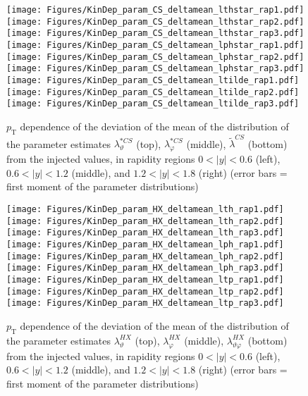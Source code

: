\documentclass[12pt]{article}
\newcommand{\pT}{p_\mathrm{T}}
\newcommand{\absy}{\left |  y \right |}
\newcommand{\lamtildeCS}{\tilde{\lambda}^{\scriptscriptstyle CS}}
\newcommand{\lamthstarCS}{\lambda^{* \scriptscriptstyle CS}_\vartheta}
\newcommand{\lamphstarCS}{\lambda^{* \scriptscriptstyle CS}_\varphi}
\newcommand{\lamthHX}{\lambda^{\scriptscriptstyle HX}_\vartheta}
\newcommand{\lamphHX}{\lambda^{\scriptscriptstyle HX}_\varphi}
\newcommand{\lamthphHX}{\lambda^{\scriptscriptstyle HX}_{\vartheta \varphi}}
\begin{document}
\begin{figure}[htbp]
\centering
\texttt{[image: Figures/KinDep\_param\_CS\_deltamean\_lthstar\_rap1.pdf]}
\texttt{[image: Figures/KinDep\_param\_CS\_deltamean\_lthstar\_rap2.pdf]}
\texttt{[image: Figures/KinDep\_param\_CS\_deltamean\_lthstar\_rap3.pdf]}
\texttt{[image: Figures/KinDep\_param\_CS\_deltamean\_lphstar\_rap1.pdf]}
\texttt{[image: Figures/KinDep\_param\_CS\_deltamean\_lphstar\_rap2.pdf]}
\texttt{[image: Figures/KinDep\_param\_CS\_deltamean\_lphstar\_rap3.pdf]}
\texttt{[image: Figures/KinDep\_param\_CS\_deltamean\_ltilde\_rap1.pdf]}
\texttt{[image: Figures/KinDep\_param\_CS\_deltamean\_ltilde\_rap2.pdf]}
\texttt{[image: Figures/KinDep\_param\_CS\_deltamean\_ltilde\_rap3.pdf]}
\caption{$\pT$ dependence of the deviation of the mean of the distribution of
the parameter estimates $\lamthstarCS$ (top), $\lamphstarCS$ (middle),
$\lamtildeCS$ (bottom) from the injected values, in rapidity regions
$0<\absy<0.6$ (left), $0.6<\absy<1.2$ (middle), and $1.2<\absy<1.8$ (right) (error bars = first moment of
the parameter distributions)}
\end{figure}
\clearpage









\begin{figure}[htbp]
\centering
\texttt{[image: Figures/KinDep\_param\_HX\_deltamean\_lth\_rap1.pdf]}
\texttt{[image: Figures/KinDep\_param\_HX\_deltamean\_lth\_rap2.pdf]}
\texttt{[image: Figures/KinDep\_param\_HX\_deltamean\_lth\_rap3.pdf]}
\texttt{[image: Figures/KinDep\_param\_HX\_deltamean\_lph\_rap1.pdf]}
\texttt{[image: Figures/KinDep\_param\_HX\_deltamean\_lph\_rap2.pdf]}
\texttt{[image: Figures/KinDep\_param\_HX\_deltamean\_lph\_rap3.pdf]}
\texttt{[image: Figures/KinDep\_param\_HX\_deltamean\_ltp\_rap1.pdf]}
\texttt{[image: Figures/KinDep\_param\_HX\_deltamean\_ltp\_rap2.pdf]}
\texttt{[image: Figures/KinDep\_param\_HX\_deltamean\_ltp\_rap3.pdf]}
\caption{$\pT$ dependence of the deviation of the mean of the distribution of
the parameter estimates $\lamthHX$ (top), $\lamphHX$ (middle), $\lamthphHX$
(bottom) from the injected values, in rapidity regions $0<\absy<0.6$ (left), 
$0.6<\absy<1.2$ (middle), and $1.2<\absy<1.8$ (right) (error bars = first moment of the parameter
distributions)}
\end{figure}
\clearpage
\end{document}
